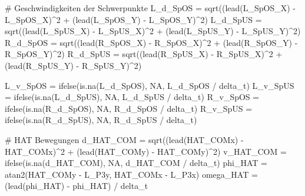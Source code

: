 \documentclass[
  letterpaper,
  DIV=11]{scrartcl}
\newenvironment{Shaded}{\begin{snugshade}}{\end{snugshade}}
\newcommand{\CommentTok}[1]{\textcolor[rgb]{0.37,0.37,0.37}{#1}}
\newcommand{\ConstantTok}[1]{\textcolor[rgb]{0.56,0.35,0.01}{#1}}
\newcommand{\DecValTok}[1]{\textcolor[rgb]{0.68,0.00,0.00}{#1}}
\newcommand{\FunctionTok}[1]{\textcolor[rgb]{0.28,0.35,0.67}{#1}}
\newcommand{\NormalTok}[1]{\textcolor[rgb]{0.00,0.23,0.31}{#1}}
\newcommand{\OtherTok}[1]{\textcolor[rgb]{0.00,0.23,0.31}{#1}}
\newcommand{\SpecialCharTok}[1]{\textcolor[rgb]{0.37,0.37,0.37}{#1}}
\begin{document}
\begin{Shaded}
\begin{Highlighting}[]
\CommentTok{\# Geschwindigkeiten der Schwerpunkte}
\NormalTok{L\_d\_SpOS }\OtherTok{=} \FunctionTok{sqrt}\NormalTok{((}\FunctionTok{lead}\NormalTok{(L\_SpOS\_X) }\SpecialCharTok{{-}}\NormalTok{ L\_SpOS\_X)}\SpecialCharTok{\^{}}\DecValTok{2} \SpecialCharTok{+}\NormalTok{ (}\FunctionTok{lead}\NormalTok{(L\_SpOS\_Y) }\SpecialCharTok{{-}}\NormalTok{ L\_SpOS\_Y)}\SpecialCharTok{\^{}}\DecValTok{2}\NormalTok{)}
\NormalTok{L\_d\_SpUS }\OtherTok{=} \FunctionTok{sqrt}\NormalTok{((}\FunctionTok{lead}\NormalTok{(L\_SpUS\_X) }\SpecialCharTok{{-}}\NormalTok{ L\_SpUS\_X)}\SpecialCharTok{\^{}}\DecValTok{2} \SpecialCharTok{+}\NormalTok{ (}\FunctionTok{lead}\NormalTok{(L\_SpUS\_Y) }\SpecialCharTok{{-}}\NormalTok{ L\_SpUS\_Y)}\SpecialCharTok{\^{}}\DecValTok{2}\NormalTok{)}
\NormalTok{R\_d\_SpOS }\OtherTok{=} \FunctionTok{sqrt}\NormalTok{((}\FunctionTok{lead}\NormalTok{(R\_SpOS\_X) }\SpecialCharTok{{-}}\NormalTok{ R\_SpOS\_X)}\SpecialCharTok{\^{}}\DecValTok{2} \SpecialCharTok{+}\NormalTok{ (}\FunctionTok{lead}\NormalTok{(R\_SpOS\_Y) }\SpecialCharTok{{-}}\NormalTok{ R\_SpOS\_Y)}\SpecialCharTok{\^{}}\DecValTok{2}\NormalTok{)}
\NormalTok{R\_d\_SpUS }\OtherTok{=} \FunctionTok{sqrt}\NormalTok{((}\FunctionTok{lead}\NormalTok{(R\_SpUS\_X) }\SpecialCharTok{{-}}\NormalTok{ R\_SpUS\_X)}\SpecialCharTok{\^{}}\DecValTok{2} \SpecialCharTok{+}\NormalTok{ (}\FunctionTok{lead}\NormalTok{(R\_SpUS\_Y) }\SpecialCharTok{{-}}\NormalTok{ R\_SpUS\_Y)}\SpecialCharTok{\^{}}\DecValTok{2}\NormalTok{)}

\NormalTok{L\_v\_SpOS }\OtherTok{=} \FunctionTok{ifelse}\NormalTok{(}\FunctionTok{is.na}\NormalTok{(L\_d\_SpOS), }\ConstantTok{NA}\NormalTok{, L\_d\_SpOS }\SpecialCharTok{/}\NormalTok{ delta\_t)}
\NormalTok{L\_v\_SpUS }\OtherTok{=} \FunctionTok{ifelse}\NormalTok{(}\FunctionTok{is.na}\NormalTok{(L\_d\_SpUS), }\ConstantTok{NA}\NormalTok{, L\_d\_SpUS }\SpecialCharTok{/}\NormalTok{ delta\_t)}
\NormalTok{R\_v\_SpOS }\OtherTok{=} \FunctionTok{ifelse}\NormalTok{(}\FunctionTok{is.na}\NormalTok{(R\_d\_SpOS), }\ConstantTok{NA}\NormalTok{, R\_d\_SpOS }\SpecialCharTok{/}\NormalTok{ delta\_t)}
\NormalTok{R\_v\_SpUS }\OtherTok{=} \FunctionTok{ifelse}\NormalTok{(}\FunctionTok{is.na}\NormalTok{(R\_d\_SpUS), }\ConstantTok{NA}\NormalTok{, R\_d\_SpUS }\SpecialCharTok{/}\NormalTok{ delta\_t)}

\CommentTok{\# HAT Bewegungen}
\NormalTok{d\_HAT\_COM }\OtherTok{=} \FunctionTok{sqrt}\NormalTok{((}\FunctionTok{lead}\NormalTok{(HAT\_COMx) }\SpecialCharTok{{-}}\NormalTok{ HAT\_COMx)}\SpecialCharTok{\^{}}\DecValTok{2} \SpecialCharTok{+}\NormalTok{ (}\FunctionTok{lead}\NormalTok{(HAT\_COMy) }\SpecialCharTok{{-}}\NormalTok{ HAT\_COMy)}\SpecialCharTok{\^{}}\DecValTok{2}\NormalTok{)}
\NormalTok{v\_HAT\_COM }\OtherTok{=} \FunctionTok{ifelse}\NormalTok{(}\FunctionTok{is.na}\NormalTok{(d\_HAT\_COM), }\ConstantTok{NA}\NormalTok{, d\_HAT\_COM }\SpecialCharTok{/}\NormalTok{ delta\_t)}
\NormalTok{phi\_HAT }\OtherTok{=} \FunctionTok{atan2}\NormalTok{(HAT\_COMy }\SpecialCharTok{{-}}\NormalTok{ L\_P3y, HAT\_COMx }\SpecialCharTok{{-}}\NormalTok{ L\_P3x)}
\NormalTok{omega\_HAT }\OtherTok{=}\NormalTok{ (}\FunctionTok{lead}\NormalTok{(phi\_HAT) }\SpecialCharTok{{-}}\NormalTok{ phi\_HAT) }\SpecialCharTok{/}\NormalTok{ delta\_t}


\end{Highlighting}
\end{Shaded}
\end{document}
